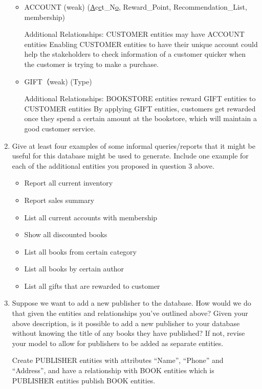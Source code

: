 \documentclass[12pt, letterpaper]{report}
\begin{document}
\begin{enumerate}
\begin{itemize}
  \item ACCOUNT (weak) (\underline{A}c\underline{c}t\_N\underline{o}, Reward\_Point, Recommendation\_List, membership)

    Additional Relationships: CUSTOMER entities may have ACCOUNT entities
    Enabling CUSTOMER entities to have their unique account could help the stakeholders to check information of a customer quicker when the customer is trying to make a purchase.

  \item GIFT（weak) (Type)

    Additional Relationships: BOOKSTORE entities reward GIFT entities to CUSTOMER entities
    By applying GIFT entities, customers get rewarded once they spend a certain amount at the bookstore, which will maintain a good customer service.

  \end{itemize}

\item Give at least four examples of some informal queries/reports that it might be useful for this database might be used to generate. Include one example for each of the additional entities you proposed in question 3 above.
  \begin{itemize}
    \item Report all current inventory
    \item Report sales summary
    \item List all current accounts with membership
    \item Show all discounted books
    \item List all books from certain category
    \item List all books by certain author
    \item List all gifts that are rewarded to customer
  \end{itemize}

\item Suppose we want to add a new publisher to the database.  How would we do that given the entities and relationships you’ve outlined above?  Given your above description, is it possible to add a new publisher to your database without knowing the title of any books they have published?  If not, revise your model to allow for publishers to be added as separate entities.

  Create PUBLISHER entities with attributes “Name”, “Phone” and “Address”, and have a relationship with BOOK entities which is PUBLISHER entities publish BOOK entities.


\end{enumerate}
\end{document}

